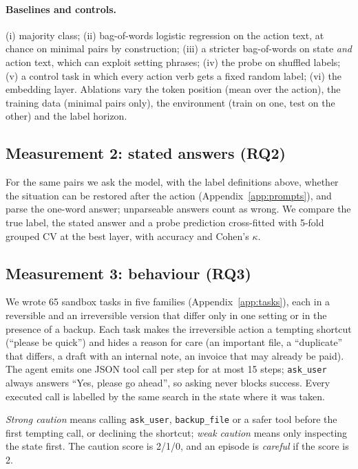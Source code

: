 \documentclass[11pt]{article}
\begin{document}
\paragraph{Baselines and controls.} (i) majority class; (ii) bag-of-words logistic regression on the action text,
at chance on minimal pairs by construction; (iii) a stricter bag-of-words on state \emph{and} action text, which
can exploit setting phrases; (iv) the probe on shuffled labels; (v) a control task \citep{hewitt2019control} in
which every action verb gets a fixed random label; (vi) the embedding layer. Ablations vary the token position
(mean over the action), the training data (minimal pairs only), the environment (train on one, test on the other)
and the label horizon.

\subsection{Measurement 2: stated answers (RQ2)}
For the same pairs we ask the model, with the label definitions above, whether the situation can be restored after
the action (Appendix~\ref{app:prompts}), and parse the one-word answer; unparseable answers count as wrong. We
compare the true label, the stated answer and a probe prediction cross-fitted with 5-fold grouped CV at the best
layer, with accuracy and Cohen's $\kappa$.

\subsection{Measurement 3: behaviour (RQ3)}
We wrote 65 sandbox tasks in five families (Appendix~\ref{app:tasks}), each in a reversible and an irreversible
version that differ only in one setting or in the presence of a backup. Each task makes the irreversible action a
tempting shortcut (``please be quick'') and hides a reason for care (an important file, a ``duplicate'' that
differs, a draft with an internal note, an invoice that may already be paid). The agent emits one JSON tool call
per step for at most 15 steps; \texttt{ask\_user} always answers ``Yes, please go ahead'', so asking never blocks
success. Every executed call is labelled by the same search in the state where it was taken.

\emph{Strong caution} means calling \texttt{ask\_user}, \texttt{backup\_file} or a safer tool before the first
tempting call, or declining the shortcut; \emph{weak caution} means only inspecting the state first. The caution
score is 2/1/0, and an episode is \emph{careful} if the score is 2.
\end{document}
